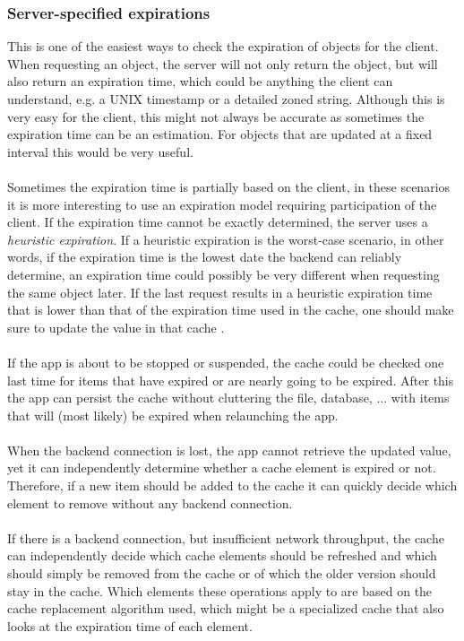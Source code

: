 \documentclass[pdftex,a4paper,12pt,twoside]{report}
\begin{document}
\subsubsection{Server-specified expirations}
\label{sec:server_spec_expirations}
This is one of the easiest ways to check the expiration of objects for the client. When requesting an object, the server will not only return the object, but will also return an expiration time, which could be anything the client can understand, e.g. a UNIX timestamp or a detailed zoned string. Although this is very easy for the client, this might not always be accurate as sometimes the expiration time can be an estimation. For objects that are updated at a fixed interval this would be very useful.
\\\\
Sometimes the expiration time is partially based on the client, in these scenarios it is more interesting to use an expiration model requiring participation of the client. If the expiration time cannot be exactly determined, the server uses a \emph{heuristic expiration}. If a heuristic expiration is the worst-case scenario, in other words, if the expiration time is the lowest date the backend can reliably determine, an expiration time could possibly be very different when requesting the same object later. If the last request results in a heuristic expiration time that is lower than that of the expiration time used in the cache, one should make sure to update the value in that cache \citep{http_caching}.
\\\\
If the app is about to be stopped or suspended, the cache could be checked one last time for items that have expired or are nearly going to be expired. After this the app can persist the cache without cluttering the file, database, ... with items that will (most likely) be expired when relaunching the app.
\\\\
When the backend connection is lost, the app cannot retrieve the updated value, yet it can independently determine whether a cache element is expired or not. Therefore, if a new item should be added to the cache it can quickly decide which element to remove without any backend connection.
\\\\
If there is a backend connection, but insufficient network throughput, the cache can independently decide which cache elements should be refreshed and which should simply be removed from the cache or of which the older version should stay in the cache. Which elements these operations apply to are based on the cache replacement algorithm used, which might be a specialized cache that also looks at the expiration time of each element.
\end{document}
